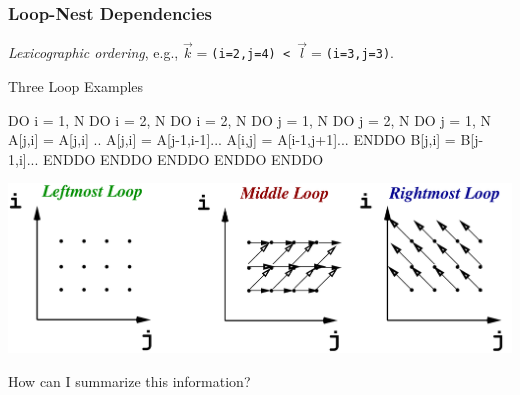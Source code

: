 \documentclass{beamer}
\begin{document}
\begin{frame}[fragile,t]
  \frametitle{Loop-Nest Dependencies} %

{\em Lexicographic ordering}, 
e.g., {\tt$\vec{k}=$(i=2,j=4) < $\vec{l}=$(i=3,j=3)}.

\begin{block}{Three Loop Examples}
\begin{colorcode}
DO i = 1, N             DO i = 2, N                 DO i = 2, N
  DO j = 1, N             DO j = 2, N                 DO j = 1, N 
    A[j,i] = A[j,i] ..      A[j,i] = A[j-1,i-1]...        A[i,j] = A[i-1,j+1]...
  ENDDO                     B[j,i] = B[j-1,i]...      ENDDO
ENDDO                   ENDDO ENDDO                 ENDDO
\end{colorcode}
\end{block} 
\pause

\hspace{-3ex}\includegraphics[height=23ex]{ParTeaserFigs/LoopDeps}  

\alert{How can I summarize this information?} %

\end{frame}
\end{document}
